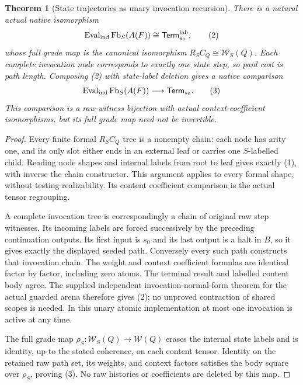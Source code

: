 \documentclass[11pt]{article}
\newtheorem{theorem}{Theorem}\newtheorem{proposition}[theorem]{Proposition}
\begin{document}
\begin{theorem}[State trajectories as unary invocation recursion]
There is a natural actual native isomorphism
\[
 \operatorname{Eval}_{\rm ind}\operatorname{Fb}_S(A(F))
 \cong \mathsf{Term}^{\rm lab}_{s_0},                    \tag{2}
\]
whose full grade map is the canonical isomorphism
$R_S C_Q\cong\mathcal W_S(Q)$. Each complete invocation node corresponds to exactly one state step, so paid cost is path length. Composing (2) with state-label deletion gives a native comparison
\[
 \operatorname{Eval}_{\rm ind}\operatorname{Fb}_S(A(F))
 \longrightarrow\mathsf{Term}_{s_0}.                    \tag{3}
\]
This comparison is a raw-witness bijection with actual context-coefficient isomorphisms, but its full grade map need not be invertible.
\end{theorem}
\begin{proof}
Every finite formal $R_S C_Q$ tree is a nonempty chain: each node has arity one, and its only slot either ends in an external leaf or carries one $S$-labelled child. Reading node shapes and internal labels from root to leaf gives exactly (1), with inverse the chain constructor. This argument applies to every formal shape, without testing realizability. Its content coefficient comparison is the actual tensor regrouping.

A complete invocation tree is correspondingly a chain of original raw step witnesses. Its incoming labels are forced successively by the preceding continuation outputs. Its first input is $s_0$ and its last output is a halt in $B$, so it gives exactly the displayed seeded path. Conversely every such path constructs that invocation chain. The weight and context coefficient formulas are identical factor by factor, including zero atoms. The terminal result and labelled content body agree. The supplied independent invocation-normal-form theorem for the actual guarded arena therefore gives (2); no unproved contraction of shared scopes is needed. In this unary atomic implementation at most one invocation is active at any time.

The full grade map $\rho_S:\mathcal W_S(Q)\to\mathcal W(Q)$ erases the internal state labels and is identity, up to the stated coherence, on each content tensor. Identity on the retained raw path set, its weights, and context factors satisfies the body square over $\rho_S$, proving (3). No raw histories or coefficients are deleted by this map.
\end{proof}
\end{document}
